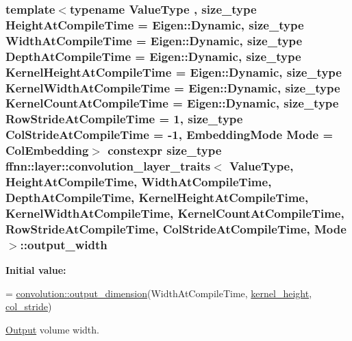 \hypertarget{structffnn_1_1layer_1_1convolution__layer__traits_a8139122e587481fb9584f2b446e4ea11}{
\subsubsection[{output\-\_\-width}]{\setlength{\rightskip}{0pt plus 5cm}template$<$typename Value\-Type , size\-\_\-type Height\-At\-Compile\-Time = Eigen\-::\-Dynamic, size\-\_\-type Width\-At\-Compile\-Time = Eigen\-::\-Dynamic, size\-\_\-type Depth\-At\-Compile\-Time = Eigen\-::\-Dynamic, size\-\_\-type Kernel\-Height\-At\-Compile\-Time = Eigen\-::\-Dynamic, size\-\_\-type Kernel\-Width\-At\-Compile\-Time = Eigen\-::\-Dynamic, size\-\_\-type Kernel\-Count\-At\-Compile\-Time = Eigen\-::\-Dynamic, size\-\_\-type Row\-Stride\-At\-Compile\-Time = 1, size\-\_\-type Col\-Stride\-At\-Compile\-Time = -\/1, Embedding\-Mode Mode = Col\-Embedding$>$ constexpr {\bf size\-\_\-type} {\bf ffnn\-::layer\-::convolution\-\_\-layer\-\_\-traits}$<$ Value\-Type, Height\-At\-Compile\-Time, Width\-At\-Compile\-Time, Depth\-At\-Compile\-Time, Kernel\-Height\-At\-Compile\-Time, Kernel\-Width\-At\-Compile\-Time, Kernel\-Count\-At\-Compile\-Time, Row\-Stride\-At\-Compile\-Time, Col\-Stride\-At\-Compile\-Time, Mode $>$\-::output\-\_\-width\hspace{0.3cm}{\ttfamily [static]}}}\label{structffnn_1_1layer_1_1convolution__layer__traits_a8139122e587481fb9584f2b446e4ea11}
{\bfseries Initial value\-:}
\begin{DoxyCode}
=
    \hyperlink{namespaceffnn_1_1layer_1_1convolution_aca263840b789df041d868a8a87dbf36a}{convolution::output\_dimension}(WidthAtCompileTime,  
      \hyperlink{structffnn_1_1layer_1_1convolution__layer__traits_ad6fb939fee90c196d31a8c98f663caa3}{kernel\_height}, \hyperlink{structffnn_1_1layer_1_1convolution__layer__traits_a36aab5cc1478feddd1085cf54b44246e}{col\_stride})
\end{DoxyCode}


\hyperlink{classffnn_1_1layer_1_1_output}{Output} volume width. 

